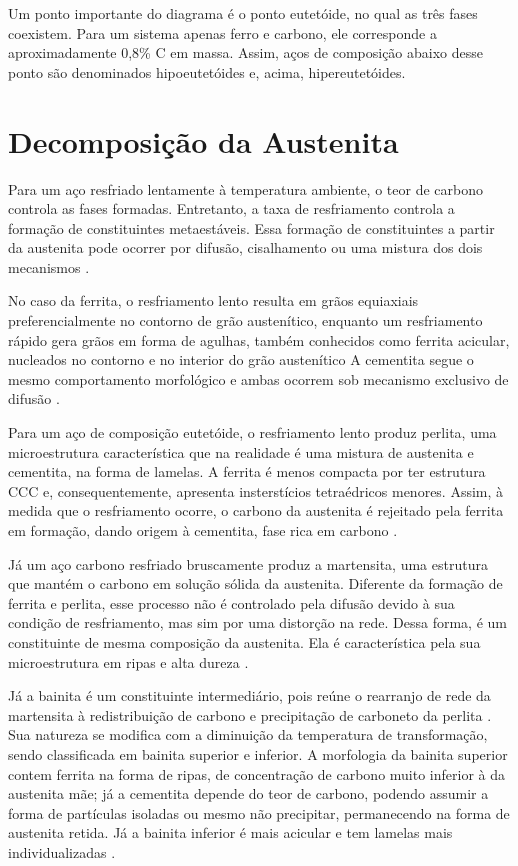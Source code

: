 \documentclass[brazil,tf,epusp]{usp}  %
\begin{document}
Um ponto importante do diagrama é o ponto eutetóide, no qual as três fases coexistem. Para um sistema apenas ferro e carbono, ele corresponde a aproximadamente 0,8\% C em massa. Assim, aços de composição abaixo desse ponto são denominados hipoeutetóides e, acima, hipereutetóides.

\section{Decomposição da Austenita}

Para um aço resfriado lentamente à temperatura ambiente, o teor de carbono controla as fases formadas. Entretanto, a taxa de resfriamento controla a formação de constituintes metaestáveis. Essa formação de constituintes a partir da austenita pode ocorrer por difusão, cisalhamento ou uma mistura dos dois mecanismos \cite{Honeycombe1982}.

No caso da ferrita, o resfriamento lento resulta em grãos equiaxiais preferencialmente no contorno de grão austenítico, enquanto um resfriamento rápido gera grãos em forma de agulhas, também conhecidos como ferrita acicular, nucleados no contorno e no interior do grão austenítico  \cite{Silva2010} %
A cementita segue o mesmo comportamento morfológico e ambas ocorrem sob mecanismo exclusivo de difusão \cite{Honeycombe1982}.

Para um aço de composição eutetóide, o resfriamento lento produz perlita, uma microestrutura característica que na realidade é uma mistura de austenita e cementita, na forma de lamelas. A ferrita é menos compacta por ter estrutura CCC e, consequentemente, apresenta insterstícios tetraédricos menores. Assim, à medida que o resfriamento ocorre, o carbono da austenita é rejeitado pela ferrita em formação, dando origem à cementita, fase rica em carbono \cite{Silva2010}.

Já um aço carbono resfriado bruscamente produz a martensita, uma estrutura que mantém o carbono em solução sólida da austenita. Diferente da formação de ferrita e perlita, esse processo não é controlado pela difusão devido à sua condição de resfriamento, mas sim por uma distorção na rede. Dessa forma, é um constituinte de mesma composição da austenita. Ela é característica pela sua microestrutura em ripas e alta dureza \cite{Honeycombe1982}.

Já a bainita é um constituinte intermediário, pois reúne o rearranjo de rede da martensita à redistribuição de carbono e precipitação de carboneto da perlita \cite{Totten2006}. Sua natureza se modifica com a diminuição da temperatura de transformação, sendo classificada em bainita superior e inferior. A morfologia da bainita superior contem ferrita na forma de ripas, de concentração de carbono muito inferior à da austenita mãe; já a cementita depende do teor de carbono, podendo assumir a forma de partículas isoladas ou mesmo não precipitar, permanecendo na forma de austenita retida. Já a bainita inferior é mais acicular e tem lamelas mais individualizadas \cite{Honeycombe1982}.
\end{document}

